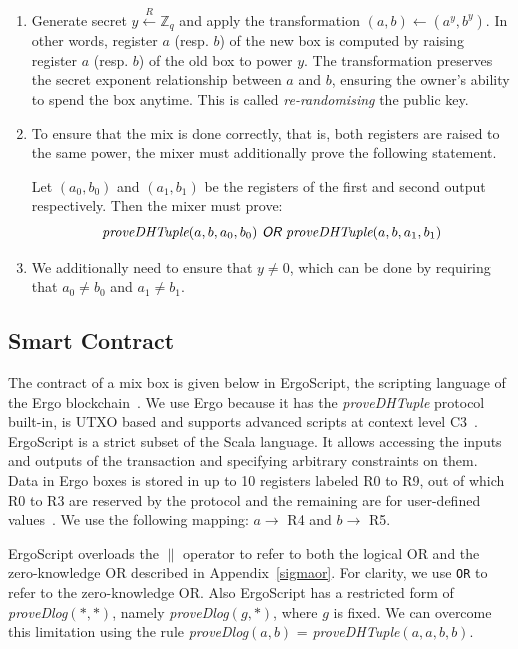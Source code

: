 \documentclass[runningheads]{llncs}
\newcommand{\rand}{\stackrel{R}{\leftarrow}}
\begin{document}
\begin{enumerate}
    \item Generate secret $y \rand \mathbb{Z}_q$ and apply the transformation $(a, b) \leftarrow (a ^y, b ^y)$. In other words, register $a$ (resp. $b$) of the new box is computed by raising register $a$ (resp. $b$) of the old box to power $y$. The transformation preserves the secret exponent relationship between $a$ and $b$, ensuring the owner's ability to spend the box anytime. This is called {\em re-randomising} the public key.
    \item To ensure that the mix is done correctly, that is, both registers are raised to the same power, the mixer must additionally prove the following statement. 

Let $(a_0, b_0)$ and $(a_1, b_1)$ be the registers of the first and second output respectively. Then the mixer must prove:
$$\text{\em proveDHTuple$(a, b, a_0, b_0)\textsf{ OR }$proveDHTuple$(a, b, a_1, b_1)$}$$

    \item We additionally need to ensure that $y \neq 0$, which can be done by requiring that $a_0 \neq b_0$ and $a_1 \neq b_1$.

\end{enumerate}

\subsection{Smart Contract}
\label{smart-contract}
The contract of a mix box is given below in ErgoScript, the scripting language of the Ergo blockchain~\cite{ergo,tutorial}. We use Ergo because it has the {\em proveDHTuple} protocol built-in, is UTXO based and supports advanced scripts at context level C3~\cite{bypassing}. ErgoScript is a strict subset of the Scala language. It allows accessing the inputs and outputs of the transaction and specifying arbitrary constraints on them.
Data in Ergo boxes is stored in up to 10 registers labeled R0 to R9, out of which R0 to R3 are reserved by the protocol and the remaining are for user-defined values~\cite{tutorial}. We use the following mapping: $a \rightarrow$ R4 and $b \rightarrow$ R5. 

ErgoScript overloads the $\|$ operator to refer to both the logical OR and the zero-knowledge OR described in Appendix~\ref{sigmaor}. For clarity, we use \texttt{OR} to refer to the zero-knowledge OR. Also ErgoScript has a restricted form of {\em proveDlog$(*, *)$}, namely {\em proveDlog$(g, *)$}, where $g$ is fixed. 
We can overcome this limitation using the rule {\em proveDlog$(a, b)$} = {\em proveDHTuple$(a, a, b, b)$}. 
\end{document}
